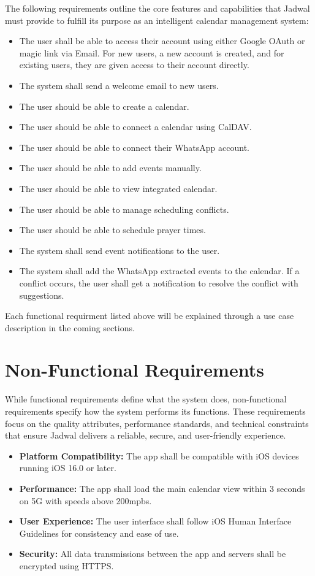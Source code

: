 \documentclass[12pt,a4paper]{report}
\begin{document}
The following requirements outline the core features and capabilities that Jadwal must provide to fulfill its purpose as an intelligent calendar management system:
\begin{itemize}
    \item The user shall be able to access their account using either Google OAuth or magic link via Email. For new users, a new account is created, and for existing users, they are given access to their account directly.
    \item The system shall send a welcome email to new users.
    \item The user should be able to create a calendar.
    \item The user should be able to connect a calendar using CalDAV.
    \item The user should be able to connect their WhatsApp account.
    \item The user should be able to add events manually.
    \item The user should be able to view integrated calendar.
    \item The user should be able to manage scheduling conflicts.
    \item The user should be able to schedule prayer times.
    \item The system shall send event notifications to the user.
    \item The system shall add the WhatsApp extracted events to the calendar. If a conflict occurs, the user shall get a notification to resolve the conflict with suggestions.
\end{itemize}

Each functional requirment listed above will be explained through a use case description in the coming sections.

\newpage

\section{Non-Functional Requirements}

While functional requirements define what the system does, non-functional requirements specify how the system performs its functions. These requirements focus on the quality attributes, performance standards, and technical constraints that ensure Jadwal delivers a reliable, secure, and user-friendly experience.

\begin{itemize}
    \item \textbf{Platform Compatibility:} The app shall be compatible with iOS devices running iOS 16.0 or later.
    \item \textbf{Performance:} The app shall load the main calendar view within 3 seconds on 5G with speeds above 200mpbs.
    \item \textbf{User Experience:} The user interface shall follow iOS Human Interface Guidelines for consistency and ease of use.
    \item \textbf{Security:} All data transmissions between the app and servers shall be encrypted using HTTPS.
\end{itemize}
\end{document}
